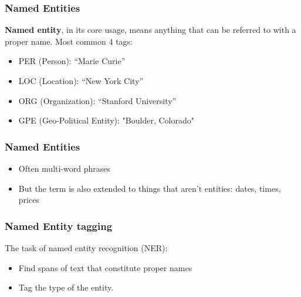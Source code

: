 \documentclass[13.5pt,aspecratio=169]{beamer}
\begin{document}
\begin{frame}
    \onehalfspacing
        \frametitle{Named Entities}
        
        \begin{block}{} %
                 {\textbf{Named entity}, in its core usage, means anything that can be referred to with a proper name. Most common 4 tags:}
                    \begin{itemize}
                        \item PER (Person): \color{blue} “Marie Curie” \color{black}
                        \item LOC (Location): \color{blue} “New York City”  \color{black}
                        \item ORG (Organization): \color{blue} “Stanford University” \color{black}
                        \item GPE (Geo-Political Entity): \color{blue} "Boulder, Colorado" \color{black}
                    \end{itemize}
        \end{block}
            \bigskip
    \end{frame}
    
    \begin{frame}
    \onehalfspacing
        \frametitle{Named Entities}
        
        \begin{block}{} %
                 
                    \begin{itemize}
                        \item Often multi-word phrases
    
                        \item But the term is also extended to things that aren't entities: dates, times, prices
                    \end{itemize}
        \end{block}
    \end{frame}
    
    
    \begin{frame}
    \onehalfspacing
        \frametitle{Named Entity tagging}
        \begin{block}{The task of named entity recognition (NER):}
            \begin{itemize}
                \item Find spans of text that constitute proper names
                    \item Tag the type of the entity.          
                \end{itemize}
        \end{block}
    \end{frame}
    
\end{document}
